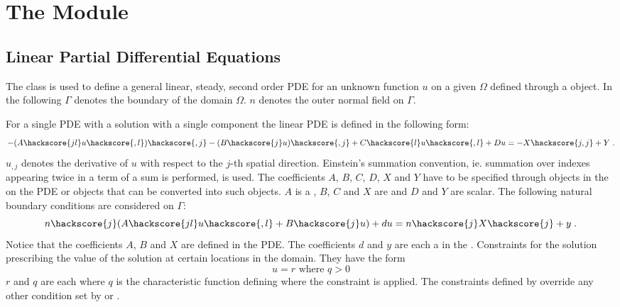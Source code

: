 %
%
%
%
%
%

\chapter{The Module \linearPDEs}



\section{Linear Partial Differential Equations}
\label{SEC LinearPDE}

The \LinearPDE class is used to define a general linear, steady, second order PDE
for an unknown function $u$ on a given $\Omega$ defined through a \Domain object.
In the following $\Gamma$ denotes the boundary of the domain $\Omega$. $n$ denotes
the outer normal field on $\Gamma$.

For a single PDE with a solution with a single component the linear PDE is defined in the
following form:
\begin{equation}\label{LINEARPDE.SINGLE.1}
-(A\hackscore{jl} u\hackscore{,l})\hackscore{,j}-(B\hackscore{j} u)\hackscore{,j}+C\hackscore{l} u\hackscore{,l}+D u =-X\hackscore{j,j}+Y \; .
\end{equation}
$u_{,j}$ denotes the derivative of $u$ with respect to the $j$-th spatial direction. Einstein's summation convention, ie. summation over indexes appearing twice in a term of a sum is performed, is used.
The coefficients $A$, $B$, $C$, $D$, $X$ and $Y$ have to be specified through \Data objects in the
\Function on the PDE or objects that can be converted into such \Data objects.
$A$ is a \RankTwo, $B$, $C$ and $X$ are \RankOne and $D$ and $Y$ are scalar.
The following natural
boundary conditions are considered  on $\Gamma$:
\begin{equation}\label{LINEARPDE.SINGLE.2}
n\hackscore{j}(A\hackscore{jl} u\hackscore{,l}+B\hackscore{j} u)+d u=n\hackscore{j}X\hackscore{j} + y  \;.
\end{equation}
Notice that the coefficients $A$, $B$ and $X$ are defined in the PDE. The coefficients $d$ and $y$ are
each a \Scalar in the \FunctionOnBoundary.  Constraints  for the solution prescribing the value of the
solution at certain locations in the domain. They have the form
\begin{equation}\label{LINEARPDE.SINGLE.3}
u=r \mbox{ where } q>0
\end{equation}
$r$ and $q$ are each \Scalar where $q$ is the characteristic function
 defining where the constraint is applied.
The constraints defined by  override any other condition set by 
or .

